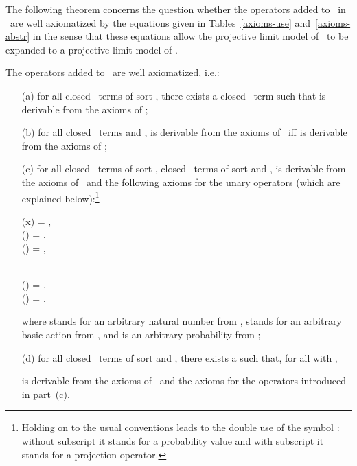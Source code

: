 \documentclass{llncs}
\begin{document}
The following theorem concerns the question whether the operators added
to \prBTA\ in \prTSI\ are well axiomatized by the equations given in 
Tables~\ref{axioms-use} and~\ref{axioms-abstr} in the sense that these 
equations allow the projective limit model of \prBTA\ to be expanded to
a projective limit model of \prTSI.
\begin{theorem}
\label{theorem-use}
The operators added to \prBTA\ are well axiomatized, i.e.:
\begin{enumerate}
\item[(a)]
for all closed \prTSI\ terms  of sort , there exists a closed 
\prBTA\ term  such that  is derivable from the axioms of 
\prTSI;
\item[(b)]
for all closed \prBTA\ terms  and ,
 is derivable from the axioms of \prBTA\ iff
 is derivable from the axioms of \prTSI;
\item[(c)]
for all closed \prTSI\ terms  of sort , closed \prTSI\ terms 
 of sort  and , 
 is derivable 
from the axioms of \prTSI\ and the following axioms for the unary 
operators  (which are explained below):\footnote
{Holding on to the usual conventions leads to the double use of the 
symbol : without subscript it stands for a probability value 
and with subscript it stands for a projection operator.}
\begin{ldispl}
\begin{geqns}
(x) = \DeadEnd\;,                                             \\
(\DeadEnd) = \DeadEnd\;,                                    \\
(\Stop) = \Stop\;,                                          \\
\end{geqns}
\quad\;\;
\begin{geqns}
{} \\
() = \;,      \\
() = \;. 
\end{geqns}
\end{ldispl}where  stands for an arbitrary natural number from ,  stands
for an arbitrary basic action from , and  is an arbitrary
probability from ;
\item[(d)]
for all closed \prTSI\ terms  of sort  and , there 
exists a  such that, for all  with , 
 
is derivable from the axioms of \prTSI\ and the axioms for the operators 
 introduced in part~(c).
\end{enumerate}
\end{theorem}
\end{document}
